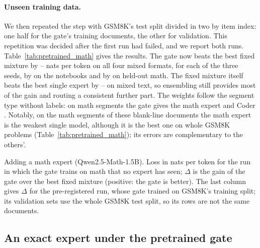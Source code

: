 \documentclass[10pt]{article}
\newcommand{\pending}[1]{{\color{red}\textbf{[#1]}}}
\begin{document}
\paragraph{Unseen training data.} We then repeated the step with GSM8K's test split divided
in two by item index: one half for the gate's training documents, the other for validation.
This repetition was decided after the first run had failed, and we report both runs.
Table~\ref{tab:pretrained_math} gives the results. The gate now beats the best fixed mixture
by \resTrackBCleanMarginMin--\resTrackBCleanMarginMax{} nats per token on all four mixed
formats, for each of the three seeds, by \resTrackBCleanNotebookMargin{} on the notebooks and
by \resTrackBCleanMathMargin{} on held-out math. The fixed mixture itself beats the best
single expert by \resTrackBCleanEnsembleMin--\resTrackBCleanEnsembleMax{} on mixed text, so
ensembling still provides most of the gain and routing a consistent further part. The weights
follow the segment type without labels: on math segments the gate gives the math expert
\resTrackBCleanWeightMathOnMath{} and Coder \resTrackBCleanWeightCoderOnMath{}. Notably, on the
math segments of these blank-line documents the math expert is the weakest single model, although
it is the best one on whole GSM8K problems (Table~\ref{tab:pretrained_math}); its errors are
complementary to the others'.
\begin{table}[t]
\centering\small
\caption{Adding a math expert (Qwen2.5-Math-1.5B). Loss in nats per token for the run in
which the gate trains on math that no expert has seen; $\Delta$ is the gain of the gate over
the best fixed mixture (positive: the gate is better). The last column gives $\Delta$ for the
pre-registered run, whose gate trained on GSM8K's training split; its validation sets use the
whole GSM8K test split, so its rows are not the same documents.}
\label{tab:pretrained_math}
{\setlength{\tabcolsep}{4pt}\IfFileExists{tables/track_b_step2.tex}{}{\pending{table}}}
\end{table}

\subsection{An exact expert under the pretrained gate}
\label{sec:pretrained_circuit}
\end{document}
